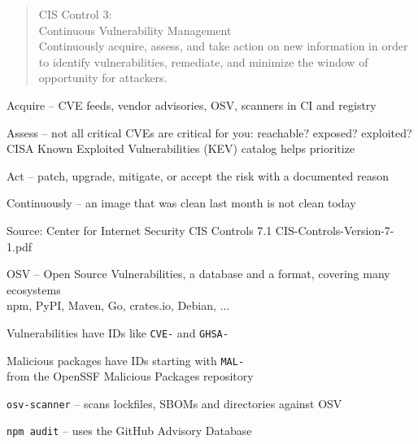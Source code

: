 \documentclass[Screen16to9,17pt]{foils}
\begin{document}

\begin{quote}
CIS Control 3:\\
Continuous Vulnerability Management\\
Continuously acquire, assess, and take action on new information in order to identify vulnerabilities, remediate, and minimize the window of opportunity for attackers.
\end{quote}

\begin{list1}
\item Acquire -- CVE feeds, vendor advisories, OSV, scanners in CI and registry
\item Assess -- not all critical CVEs are critical for you: reachable? exposed? exploited?\\
CISA Known Exploited Vulnerabilities (KEV) catalog helps prioritize
\item Act -- patch, upgrade, mitigate, or accept the risk with a documented reason
\item Continuously -- an image that was clean last month is not clean today
\end{list1}

Source: Center for Internet Security CIS Controls 7.1 CIS-Controls-Version-7-1.pdf



\begin{list2}
\item OSV -- Open Source Vulnerabilities, a database and a format, covering many ecosystems\\
npm, PyPI, Maven, Go, crates.io, Debian, ...
\item Vulnerabilities have IDs like \verb+CVE-+ and \verb+GHSA-+
\item Malicious packages have IDs starting with \verb+MAL-+\\
from the OpenSSF Malicious Packages repository
\item \verb+osv-scanner+ -- scans lockfiles, SBOMs and directories against OSV
\item \verb+npm audit+ -- uses the GitHub Advisory Database
\end{list2}

{\footnotesize{}\\
\\
}
\end{document}
